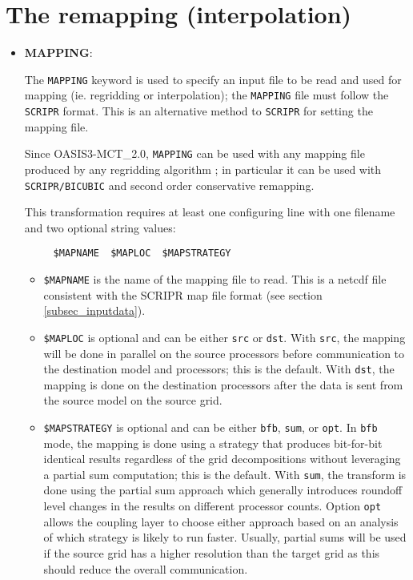 
\section{The remapping (interpolation)}
\label{subsec_interp}

\begin{itemize}

\item {\bf MAPPING}: 

  The {\tt MAPPING} keyword is used to specify an input file to be
  read and used for mapping (ie. regridding or interpolation); the {\tt MAPPING} file must follow the {\tt SCRIPR} format. 
  This is an alternative method to {\tt SCRIPR} for setting the mapping file.
 
  Since OASIS3-MCT\_2.0, {\tt MAPPING} can be used with
  any mapping file produced by any regridding algorithm ; in particular it can be used 
  with {\tt SCRIPR/BICUBIC} and second order conservative remapping.   

This transformation requires at least one configuring line with one
filename and two optional string values:
\begin{verbatim}
     $MAPNAME  $MAPLOC  $MAPSTRATEGY
\end{verbatim}
  \begin{itemize}
  \item {\tt \$MAPNAME} is the name of the mapping file to read.  This
    is a netcdf file consistent with the SCRIPR map file format (see section
  \ref{subsec_inputdata}).

  \item {\tt \$MAPLOC} is optional and can be either {\tt src} or {\tt dst}.  With {\tt src}, the mapping will be done
  in parallel on the source processors before communication to the destination model and processors; this is the default.   
  With {\tt dst}, the mapping is 
  done on the destination processors after the data is sent from the source
  model on the source grid. 

  \item {\tt \$MAPSTRATEGY} is optional and can be either {\tt bfb}, {\tt sum}, or {\tt opt}.  In {\tt bfb} mode, the mapping is
  done using a strategy that produces bit-for-bit identical results regardless
  of the grid decompositions without leveraging a partial sum computation; this is the default.  With
  {\tt sum}, the transform is done using the partial sum approach which generally
  introduces roundoff level changes in the results on different processor
  counts. Option {\tt opt} allows the coupling layer to choose either
  approach based on an analysis of which strategy is likely to run
  faster. Usually, partial sums will be used if the source grid has a higher resolution
  than the target grid as this should reduce the overall
  communication.


\end{itemize}
\end{itemize}
